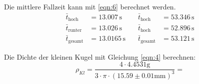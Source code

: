 Die mittlere Fallzeit kann mit \ref{eqn:6} berechnet werden.\\
\begin{align}
  \bar{t}_{\text{hoch}} &= 13.007\,\unit{\second}  \quad &\bar{t}_{\text{hoch}} &= 53.346\,\unit{\second}\\
  \bar{t}_{\text{runter}} &= 13.026\,\unit{\second}  \quad &\bar{t}_{\text{hoch}} &= 52.896\,\unit{\second}\\
  \bar{t}_{\text{gesamt}} &= 13.0165\,\unit{\second}  \quad &\bar{t}_{\text{gesamt}} &= 53.121\,\unit{\second}
\end{align}

Die Dichte der kleinen Kugel mit Gleichung \ref{eqn:4} berechnen:
\begin{equation}
  ρ_{Kl} = \frac{4 \cdot 4.4531 \unit{\gram}}{3 \cdot π \cdot (15.59 \pm 0.01 \unit{\milli\meter})^3} = 
\end{equation}

